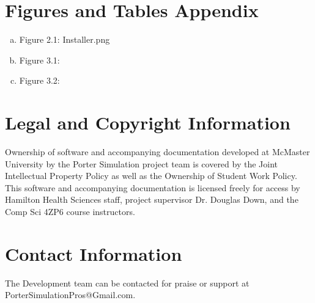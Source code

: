 \documentclass[paper=letter, fontsize=10pt]{scrartcl}
\numberwithin{equation}{section}		%
\numberwithin{figure}{section}			%
\numberwithin{table}{section}				%
\begin{document}
\section{Figures and Tables Appendix}
\begin{enumerate}[(a)]
	\item Figure 2.1: Installer.png
	\item Figure 3.1: 
	\item Figure 3.2:
\end{enumerate}

\section{Legal and Copyright Information}
Ownership of software and accompanying documentation developed at McMaster University by the Porter Simulation project team is covered by the Joint Intellectual Property Policy as well as the Ownership of Student Work Policy. This software and accompanying documentation is licensed freely for access by Hamilton Health Sciences staff, project supervisor Dr. Douglas Down, and the Comp Sci 4ZP6 course instructors.

\section{Contact Information}
The Development team can be contacted for praise or support at PorterSimulationPros@Gmail.com.



\end{document}
